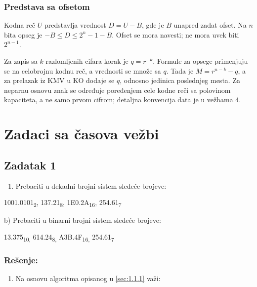 \documentclass[a4paper,11pt]{article}
\numberwithin{equation}{section}
\newcommand{\napomena}[1]{\begin{tcolorbox}[colback=gray!10,colframe=black,boxrule=0.5pt,breakable]#1\end{tcolorbox}}
\begin{document}
\subsubsection{Predstava sa ofsetom}
\label{sec:ofset}
Kodna reč $U$ predstavlja vrednost $D=U-B$, gde je $B$ unapred zadat ofset. Na $n$ bita opseg je $-B\le D\le2^n-1-B$. Ofset se mora navesti; ne mora uvek biti $2^{n-1}$.
\napomena{Za zapis sa $k$ razlomljenih cifara korak je $q=r^{-k}$. Formule za opsege primenjuju se na celobrojnu kodnu reč, a vrednosti se množe sa $q$. Tada je $M=r^{n-k}-q$, a za prelazak iz KMV u KO dodaje se $q$, odnosno jedinica poslednjeg mesta. Za neparnu osnovu znak se određuje poređenjem cele kodne reči sa polovinom kapaciteta, a ne samo prvom cifrom; detaljna konvencija data je u vežbama 4.}

\FloatBarrier
\section{Zadaci sa časova vežbi}\label{sec:2}


\FloatBarrier
\subsection{Zadatak 1}\label{sec:2.1}


\begin{enumerate}[label=\alph*),start=1,leftmargin=*]
\item Prebaciti u dekadni brojni sistem sledeće brojeve:

\end{enumerate}


1001.0101\textsubscript{2}, 137.21\textsubscript{8}, 1E0.2A\textsubscript{16}, 254.61\textsubscript{7}



b) Prebaciti u binarni brojni sistem sledeće brojeve:



13.375\textsubscript{10,} 614.24\textsubscript{8,} A3B.4F\textsubscript{16,} 254.61\textsubscript{7}



\subsubsection*{Rešenje:}


\begin{enumerate}[label=\alph*),start=1,leftmargin=*]
\item Na osnovu algoritma opisanog u \ref{sec:1.1.1} važi:

\end{enumerate}
\end{document}
